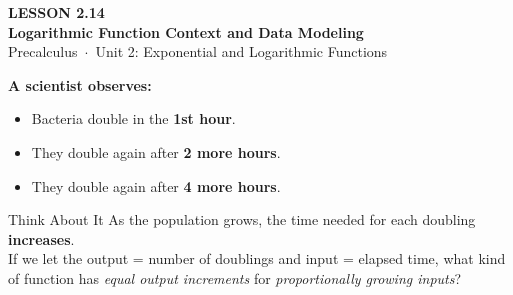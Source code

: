 \documentclass[aspectratio=169, 11pt]{beamer}
\begin{document}
{
\begin{frame}[plain]
  \vspace{2.8cm}\hspace{0.55cm}%
  \begin{minipage}{0.9\textwidth}
    {\color{goldacc}\bfseries\small LESSON 2.14}\\[0.5cm]
    {\color{white}\bfseries\LARGE Logarithmic Function Context and Data Modeling}\\[1.2cm]
    {\color{skymid}\small Precalculus~$\cdot$~Unit 2: Exponential and Logarithmic Functions}
  \end{minipage}
\end{frame}
}

\begin{frame}[t, plain]

  \vspace{0.3cm}
  \textbf{A scientist observes:}
  \begin{itemize}
    \setlength{\itemsep}{8pt}
    \item Bacteria double in the \textbf{1st hour}.
    \item They double again after \textbf{2 more hours}.
    \item They double again after \textbf{4 more hours}.
  \end{itemize}

  \vspace{0.4cm}
  \begin{block}{Think About It}
    As the population grows, the time needed for each doubling \textbf{increases}.\\[6pt]
    If we let the output = number of doublings and input = elapsed time, what kind
    of function has \emph{equal output increments} for \emph{proportionally growing inputs}?
  \end{block}
\end{frame}
\end{document}
